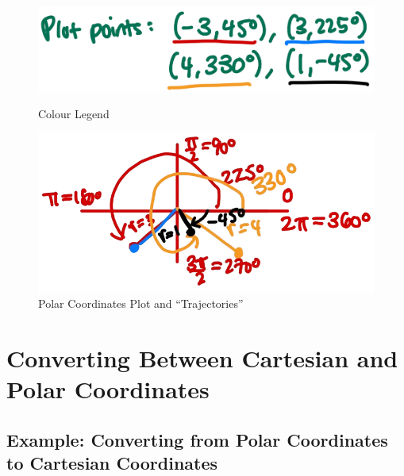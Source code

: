 \documentclass{article}
\begin{document}
\begin{examplebox}
\begin{solutionbox}
    \begin{figure}[H]
        \centering
        \begin{minipage}{0.3\textwidth}
            \centering
            \includegraphics[width=\textwidth]{plot points.png}
            \caption{Colour Legend}
            \label{fig:image1}
        \end{minipage}%
        \hspace{0.04\textwidth} %
        \begin{minipage}{0.65\textwidth}
            \centering
            \includegraphics[width=\textwidth]{plot points example.png}
            \caption{Polar Coordinates Plot and ``Trajectories''}
            \label{fig:image2}
        \end{minipage}
    \end{figure}    
\end{solutionbox}
\end{examplebox}

\section*{Converting Between Cartesian and Polar Coordinates}

\subsection*{Example: Converting from Polar Coordinates to Cartesian Coordinates}
\end{document}
